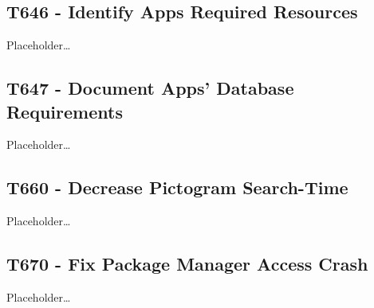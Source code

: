 \subsection{T646 - Identify Apps Required Resources}
Placeholder\ldots

\subsection{T647 - Document Apps' Database Requirements}
Placeholder\ldots

\subsection{T660 - Decrease Pictogram Search-Time}
Placeholder\ldots

\subsection{T670 - Fix Package Manager Access Crash}
Placeholder\ldots


